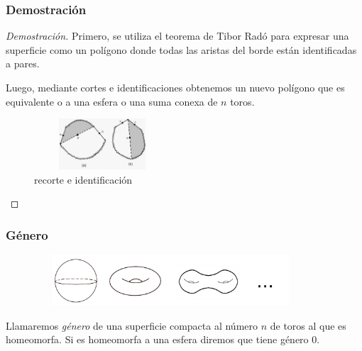 \documentclass{beamer}
\begin{document}
\begin{frame}
\frametitle{Demostración}
\begin{proof}[Demostración]
Primero, se utiliza el teorema de Tibor Radó para expresar una superficie como un polígono donde todas las aristas del borde están identificadas a pares.

Luego, mediante cortes e identificaciones obtenemos un nuevo polígono que es equivalente o a una esfera o una suma conexa de $n$ toros.

\begin{figure}[htb]
\begin{center}
\includegraphics[width=2in,height=0.75in]{imagenes/paso4.jpeg} 
\caption{recorte e identificación}
\end{center}
\end{figure}
 
\end{proof}

\end{frame}

\begin{frame}
\frametitle{Género}
\begin{figure}[htb]
\begin{center}
\includegraphics[width=4in,height=0.75in]{imagenes/diapo4.png} 
\end{center}
\end{figure}

Llamaremos \textit{género} de una superficie compacta al número $n$ de toros al que es homeomorfa. Si es homeomorfa a una esfera diremos que tiene género 0.

\end{frame}
\end{document}
